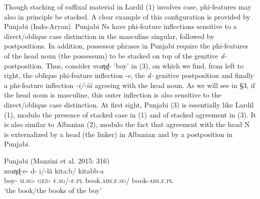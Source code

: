 \documentclass[output=paper]{langsci/langscibook}
\begin{document}
Though stacking of suffixal material in Lardil (1) involves case, phi-features may also in principle be stacked. A clear example of this configuration is provided by Punjabi (Indo-Aryan). Punjabi Ns have phi-feature inflections sensitive to a direct/oblique case distinction in the masculine singular, followed by postpositions. In addition, possessor phrases in Punjabi require the phi-features of the head noun (the possessum) to be stacked on top of the genitive \textit{d-} postposition. Thus, consider \textit{muɳɖ}{}- ‘boy’ in (3), on which we find, from left to right, the oblique phi-feature inflection -\textit{e}, the \textit{d-} genitive postposition and finally a phi-feature inflection \textit{{}-}\textit{i/-ĩã} agreeing with the head noun. As we will see in §3, if the head noun is masculine, this outer inflection is also sensitive to the direct/oblique case distinction. At first sight, Punjabi (3) is essentially like Lardil (1), modulo the presence of stacked case in (1) and of stacked agreement in (3). It is also similar to Albanian (2), modulo the fact that agreement with the head N is externalized by a head (the linker) in Albanian and by a postposition in Punjabi. 

\ea%
Punjabi (Manzini et al. 2015: 316)\\
\gll muɳɖ-e-  d-  i/-ĩã    kita:b/      kitabb-a\\
     boy-  \textsc{m.sg-  gen-  f.sg/-f.pl}  book.\textsc{abs.f.sg}/   book-\textsc{abs.f.pl}\\
\glt ‘the book/the books of the boy’
\z
\end{document}
